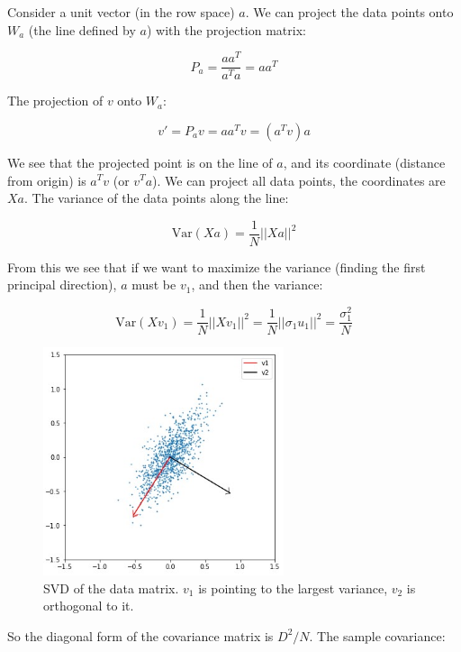\documentclass{article}
\begin{document}
Consider a unit vector (in the row space) $a$. We can project the data points onto $W_a$ (the line defined by $a$) with the projection matrix:

\begin{equation}
    P_a = \frac{aa^T}{a^Ta} = aa^T
\end{equation}

The projection of $v$ onto $W_a$:

\begin{equation}
    v' = P_a v = aa^T v = (a^T v) a
\end{equation}

We see that the projected point is on the line of $a$, and its coordinate (distance from origin) is $a^T v$ (or $v^T a$). We can project all data points, the coordinates are $Xa$. The variance of the data points along the line:

\begin{equation}
    \text{Var}(Xa) = \frac{1}{N} ||Xa||^2
\end{equation}

From this we see that if we want to maximize the variance (finding the first principal direction), $a$ must be $v_1$, and then the variance:

\begin{equation}
    \text{Var}(Xv_1) = \frac{1}{N} ||Xv_1||^2 = \frac{1}{N} ||\sigma_1 u_1||^2 = \frac{\sigma_1^2}{N}
\end{equation}


\begin{figure}[ht]
 \centering
  \includegraphics[width=200pt]{images/data_matrix_pca.jpg}
 \caption{SVD of the data matrix. $v_1$ is pointing to the largest variance, $v_2$ is orthogonal to it.}
\end{figure}

So the diagonal form of the covariance matrix is $D^2/N$. The sample covariance:
\end{document}

